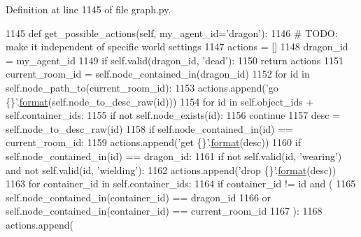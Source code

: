 Definition at line 1145 of file graph.\+py.


\begin{DoxyCode}
1145     \textcolor{keyword}{def }get\_possible\_actions(self, my\_agent\_id='dragon'):
1146         \textcolor{comment}{# TODO: make it independent of specific world settings}
1147         actions = []
1148         dragon\_id = my\_agent\_id
1149         \textcolor{keywordflow}{if} self.valid(dragon\_id, \textcolor{stringliteral}{'dead'}):
1150             \textcolor{keywordflow}{return} actions
1151         current\_room\_id = self.node\_contained\_in(dragon\_id)
1152         \textcolor{keywordflow}{for} id \textcolor{keywordflow}{in} self.node\_path\_to(current\_room\_id):
1153             actions.append(\textcolor{stringliteral}{'go \{\}'}.\hyperlink{namespaceparlai_1_1chat__service_1_1services_1_1messenger_1_1shared__utils_a32e2e2022b824fbaf80c747160b52a76}{format}(self.node\_to\_desc\_raw(id)))
1154         \textcolor{keywordflow}{for} id \textcolor{keywordflow}{in} self.object\_ids + self.container\_ids:
1155             \textcolor{keywordflow}{if} \textcolor{keywordflow}{not} self.node\_exists(id):
1156                 \textcolor{keywordflow}{continue}
1157             desc = self.node\_to\_desc\_raw(id)
1158             \textcolor{keywordflow}{if} self.node\_contained\_in(id) == current\_room\_id:
1159                 actions.append(\textcolor{stringliteral}{'get \{\}'}.\hyperlink{namespaceparlai_1_1chat__service_1_1services_1_1messenger_1_1shared__utils_a32e2e2022b824fbaf80c747160b52a76}{format}(desc))
1160             \textcolor{keywordflow}{if} self.node\_contained\_in(id) == dragon\_id:
1161                 \textcolor{keywordflow}{if} \textcolor{keywordflow}{not} self.valid(id, \textcolor{stringliteral}{'wearing'}) \textcolor{keywordflow}{and} \textcolor{keywordflow}{not} self.valid(id, \textcolor{stringliteral}{'wielding'}):
1162                     actions.append(\textcolor{stringliteral}{'drop \{\}'}.\hyperlink{namespaceparlai_1_1chat__service_1_1services_1_1messenger_1_1shared__utils_a32e2e2022b824fbaf80c747160b52a76}{format}(desc))
1163                     \textcolor{keywordflow}{for} container\_id \textcolor{keywordflow}{in} self.container\_ids:
1164                         \textcolor{keywordflow}{if} container\_id != id \textcolor{keywordflow}{and} (
1165                             self.node\_contained\_in(container\_id) == dragon\_id
1166                             \textcolor{keywordflow}{or} self.node\_contained\_in(container\_id) == current\_room\_id
1167                         ):
1168                             actions.append(

\end{DoxyCode}
